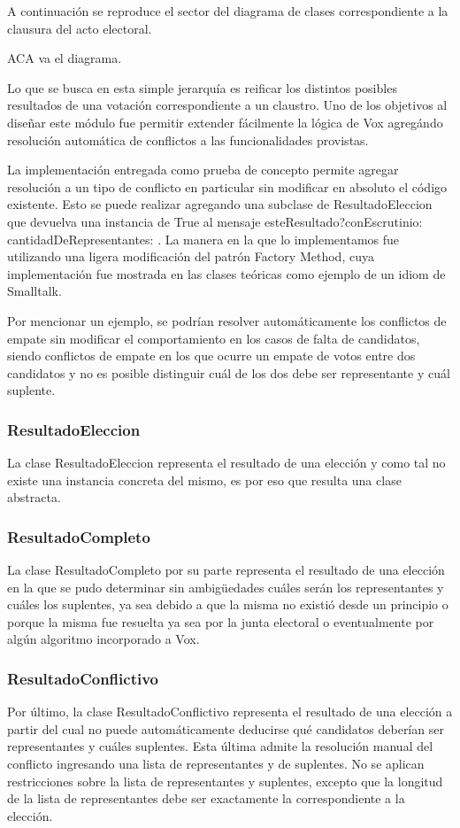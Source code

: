 A continuaci\'on se reproduce el sector del diagrama de clases correspondiente a la clausura del acto electoral.


ACA va el diagrama.



Lo que se busca en esta simple jerarquía es reificar los distintos posibles resultados de una votación correspondiente a un claustro. Uno de los objetivos al diseñar este módulo fue permitir extender fácilmente la lógica de Vox agregándo resolución automática de conflictos a las funcionalidades provistas.

La implementación entregada como prueba de concepto permite agregar resolución a un tipo de conflicto en particular sin modificar en absoluto el código existente. Esto se puede realizar agregando una subclase de ResultadoEleccion que devuelva una instancia de True al mensaje esteResultado?conEscrutinio: cantidadDeRepresentantes: . La manera en la que lo implementamos fue utilizando una ligera modificación del patrón Factory Method, cuya implementación fue mostrada en las clases teóricas como ejemplo de un idiom de Smalltalk. 

Por mencionar un ejemplo, se podrían resolver automáticamente los conflictos de empate sin modificar el comportamiento en los casos de falta de candidatos, siendo conflictos de empate en los que ocurre un empate de votos entre dos candidatos y no es posible distinguir cuál de los dos debe ser representante y cuál suplente.

\subsubsection{ResultadoEleccion}


La clase ResultadoEleccion representa el resultado de una elección y como tal no existe una instancia concreta del mismo, es por eso que resulta una clase abstracta. 

\subsubsection{ResultadoCompleto}
La clase ResultadoCompleto por su parte representa el resultado de una elección en la que se pudo determinar sin ambigüedades cuáles serán los representantes y cuáles los suplentes, ya sea debido a que la misma no existió desde un principio o porque la misma fue resuelta ya sea por la junta electoral o eventualmente por algún algoritmo incorporado a Vox.


\subsubsection{ResultadoConflictivo}
Por último, la clase ResultadoConflictivo representa el resultado de una elección a partir del cual no puede automáticamente deducirse qué candidatos deberían ser representantes y cuáles suplentes. Esta última admite la resolución manual del conflicto ingresando una lista de representantes y de suplentes. No se aplican restricciones sobre la lista de representantes y suplentes, excepto que la longitud de la lista de representantes debe ser exactamente la correspondiente a la elección.




